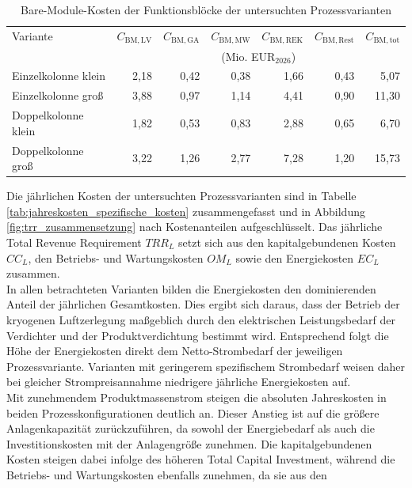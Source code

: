 \begin{table}[H]
\centering
\caption{Bare-Module-Kosten der Funktionsblöcke der untersuchten Prozessvarianten}
\label{tab:bare_module_funktionsbloecke}
\small
\begin{tabular}{lrrrrrr}
\hline
Variante
& $C_{\mathrm{BM,LV}}$
& $C_{\mathrm{BM,GA}}$
& $C_{\mathrm{BM,MW}}$
& $C_{\mathrm{BM,REK}}$
& $C_{\mathrm{BM,Rest}}$
& $C_{\mathrm{BM,tot}}$ \\
&
\multicolumn{6}{c}{(Mio. EUR$_{2026}$)} \\
\hline
Einzelkolonne klein
& 2{,}18
& 0{,}42
& 0{,}38
& 1{,}66
& 0{,}43
& 5{,}07 \\

Einzelkolonne groß
& 3{,}88
& 0{,}97
& 1{,}14
& 4{,}41
& 0{,}90
& 11{,}30 \\

Doppelkolonne klein
& 1{,}82
& 0{,}53
& 0{,}83
& 2{,}88
& 0{,}65
& 6{,}70 \\

Doppelkolonne groß
& 3{,}22
& 1{,}26
& 2{,}77
& 7{,}28
& 1{,}20
& 15{,}73 \\
\hline
\end{tabular}
\end{table}
\noindent
Die jährlichen Kosten der untersuchten Prozessvarianten sind in
Tabelle \ref{tab:jahreskosten_spezifische_kosten} zusammengefasst und in Abbildung \ref{fig:trr_zusammensetzung} nach Kostenanteilen aufgeschlüsselt. Das jährliche Total Revenue Requirement \(TRR_L\) setzt sich aus den kapitalgebundenen Kosten \(CC_L\), den Betriebs- und Wartungskosten \(OM_L\) sowie den Energiekosten \(EC_L\) zusammen.\\
In allen betrachteten Varianten bilden die Energiekosten den dominierenden Anteil der jährlichen Gesamtkosten. Dies ergibt sich daraus, dass der Betrieb der kryogenen Luftzerlegung maßgeblich durch den elektrischen Leistungsbedarf der Verdichter und der Produktverdichtung bestimmt wird. Entsprechend folgt die
Höhe der Energiekosten direkt dem Netto-Strombedarf der jeweiligen
Prozessvariante. Varianten mit geringerem spezifischem Strombedarf weisen daher bei gleicher Strompreisannahme niedrigere jährliche Energiekosten auf.\\
Mit zunehmendem Produktmassenstrom steigen die absoluten Jahreskosten in beiden Prozesskonfigurationen deutlich an. Dieser Anstieg ist auf die größere Anlagenkapazität zurückzuführen, da sowohl der Energiebedarf als auch die Investitionskosten mit der Anlagengröße zunehmen. Die kapitalgebundenen Kosten
steigen dabei infolge des höheren Total Capital Investment, während die Betriebs- und Wartungskosten ebenfalls zunehmen, da sie aus den
